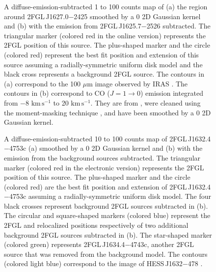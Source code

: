 \documentclass[12pt,preprint]{aastex}
\newif\ifcolorfigure
\newcommand{\gev}{\text{GeV}\xspace}
\newcommand{\tev}{\text{TeV}\xspace}
\newcommand{\s}{\text{s}\xspace}
\newcommand{\km}{\text{km}\xspace}
\begin{document}
\begin{figure}
    \ifcolorfigure
      \plotone{source_plots/source_Ophiuchus_color.eps}
    \else
    \fi
  \caption{
  A diffuse-emission-subtracted 1 \gev to 100 \gev counts map of (a) the region
  around 2FGL\,J1627.0$-$2425 smoothed by a 0 2D Gaussian kernel and (b)
  with the emission from 2FGL\,J1625.7$-$2526
  subtracted.  The triangular marker 
  (colored red in the
  online version) represents the 2FGL position of this source.
  The plus-shaped marker and the circle (colored red) 
  represent the best fit position and extension of this
  source assuming a radially-symmetric uniform disk model
  and the black cross represents a background 2FGL source. 
  The
  contours in (a) correspond to the 100 $\mu$m image observed by
  IRAS \citep{iras_rho_ophiuci}.  The contours in (b) correspond to
  CO ($J=1\rightarrow 0$) emission integrated from $-$8 $\km\,\s^{-1}$
  to 20 $\km\,\s^{-1}$.  They are from \cite{co_rho_ophiuci}, were cleaned using
  the moment-masking technique \citep{masking_moment_2011}, and have
  been smoothed by a 0 2D Gaussian kernel.
  }\label{1FGL_J1628.6-2419c}
\end{figure}

\begin{figure}
    \ifcolorfigure
      \plotone{source_plots/source_HESS_J1632-478_color.eps}
    \else
    \fi
  \caption{
  A diffuse-emission-subtracted 10 \gev to 100 \gev counts map of
  2FGL\,J1632.4$-$4753c (a) smoothed by a 0 2D Gaussian
  kernel and (b) with the emission from the background sources subtracted.  
  The triangular marker (colored red in the electronic version)
  represents the 2FGL position of this source.  The plus-shaped marker
  and the circle (colored red) are the best fit position and extension of
  2FGL\,J1632.4$-$4753c assuming a radially-symmetric uniform disk model.  
  The four black crosses represent background 2FGL
  sources subtracted in (b).  The 
  circular and square-shaped markers (colored blue) represent 
  the 2FGL and relocalized positions respectively of two
  additional background 2FGL sources subtracted in (b).
  The star-shaped marker (colored green) represents 
  2FGL\,J1634.4$-$4743c, another 2FGL source that was removed from the background model.
  The contours (colored light blue) correspond to the \tev image of
  HESS\,J1632$-$478 \citep{hess_plane_survey}.
  }\label{1FGL_J1632.9-4802c}
\end{figure}
\end{document}
